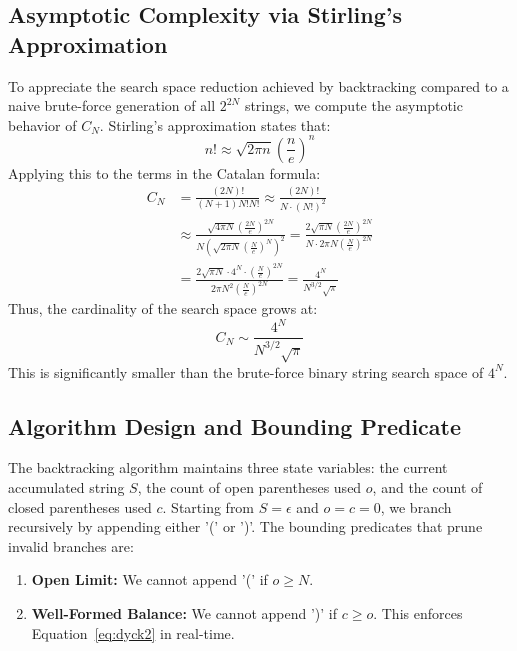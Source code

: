 \documentclass[10pt,journal,compsoc,onecolumn]{IEEEtran}
\begin{document}
\subsection{Asymptotic Complexity via Stirling's Approximation}
To appreciate the search space reduction achieved by backtracking compared to a naive brute-force generation of all $2^{2N}$ strings, we compute the asymptotic behavior of $C_N$. Stirling's approximation states that:
\begin{equation}
n! \approx \sqrt{2\pi n} \left(\frac{n}{e}\right)^n
\end{equation}
Applying this to the terms in the Catalan formula:
\begin{align}
C_N &= \frac{(2N)!}{(N+1)N!N!} \approx \frac{(2N)!}{N \cdot (N!)^2} \\
&\approx \frac{\sqrt{4\pi N} \left(\frac{2N}{e}\right)^{2N}}{N \left( \sqrt{2\pi N} \left(\frac{N}{e}\right)^N \right)^2} = \frac{2\sqrt{\pi N} \left(\frac{2N}{e}\right)^{2N}}{N \cdot 2\pi N \left(\frac{N}{e}\right)^{2N}} \\
&= \frac{2\sqrt{\pi N} \cdot 4^N \cdot \left(\frac{N}{e}\right)^{2N}}{2\pi N^2 \left(\frac{N}{e}\right)^{2N}} = \frac{4^N}{N^{3/2}\sqrt{\pi}}
\end{align}
Thus, the cardinality of the search space grows at:
\begin{equation}
C_N \sim \frac{4^N}{N^{3/2}\sqrt{\pi}}
\end{equation}
This is significantly smaller than the brute-force binary string search space of $4^N$.

\subsection{Algorithm Design and Bounding Predicate}
The backtracking algorithm maintains three state variables: the current accumulated string $S$, the count of open parentheses used $o$, and the count of closed parentheses used $c$. Starting from $S = \epsilon$ and $o = c = 0$, we branch recursively by appending either '(' or ')'.
The bounding predicates that prune invalid branches are:
\begin{enumerate}
    \item \textbf{Open Limit:} We cannot append '(' if $o \ge N$.
    \item \textbf{Well-Formed Balance:} We cannot append ')' if $c \ge o$. This enforces Equation~\eqref{eq:dyck2} in real-time.
\end{enumerate}
\end{document}

